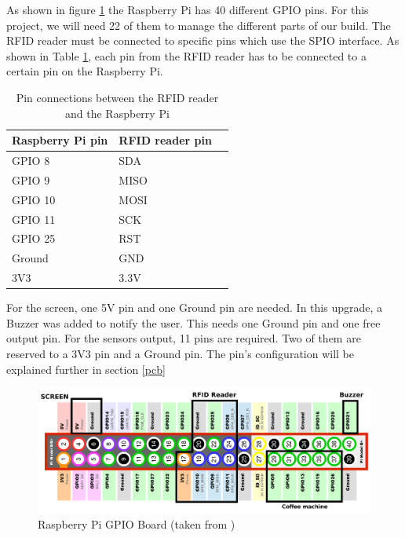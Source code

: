 \documentclass[12pt]{article}
\begin{document}
  As shown in figure \ref{fig:raspberryGPIO} the Raspberry Pi has 40 different GPIO pins. For this project, we will need 22 of them to manage the different parts of our build.
  The RFID reader must be connected to specific pins which use the SPIO interface. 
  As shown in Table \ref{tab:rfidGPIO}, each pin from the RFID reader has to be connected to a certain pin on the Raspberry Pi.
  \begin{table}[H]
  \centering
  \begin{tabular}{llr}
   \hline
  Raspberry Pi pin & RFID reader pin\\
  \hline
  GPIO 8 & SDA\\
  GPIO 9 & MISO\\
  GPIO 10 &  MOSI\\
  GPIO 11 & SCK\\
  GPIO 25 & RST\\
  Ground & GND\\
  3V3 & 3.3V\\
  \hline
  \end{tabular}
  \caption{Pin connections between the RFID reader and the Raspberry Pi}
  \label{tab:rfidGPIO}
  \end{table}
  For the screen, one 5V pin and one Ground pin are needed. In this upgrade, a Buzzer was added to notify the user. This needs one Ground pin and one free output pin.
  For the sensors output, 11 pins are required. Two of them are reserved to a 3V3 pin and a Ground pin. The pin's configuration will be explained further in section \ref{pcb}
  
   \begin{figure}[H]
   \centering
   \includegraphics[width=1.0\textwidth]{./images/raspberryGPIO}
   \captionsetup{justification=centering}
   \caption{Raspberry Pi GPIO Board (taken from \cite{gpioBoard})}
   \label{fig:raspberryGPIO}
  \end{figure}
  
  
\end{document}
